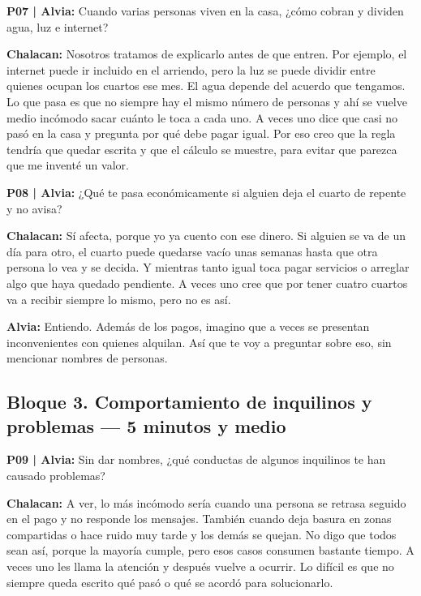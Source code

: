\documentclass[11pt,a4paper]{article}
\newcommand{\habla}[2]{
    \par\noindent\hspace*{0.8em}\textbf{#1:} #2\par
}
\newcommand{\pregunta}[2]{
    \par\noindent\textbf{P#1 | Alvia:} #2\par
}
\begin{document}
\pregunta{07}{
Cuando varias personas viven en la casa, ¿cómo cobran y dividen agua, luz e internet?
}

\habla{Chalacan}{
Nosotros tratamos de explicarlo antes de que entren. Por ejemplo, el internet puede ir incluido en el arriendo, pero la luz se puede dividir entre quienes ocupan los cuartos ese mes. El agua depende del acuerdo que tengamos. Lo que pasa es que no siempre hay el mismo número de personas y ahí se vuelve medio incómodo sacar cuánto le toca a cada uno. A veces uno dice que casi no pasó en la casa y pregunta por qué debe pagar igual. Por eso creo que la regla tendría que quedar escrita y que el cálculo se muestre, para evitar que parezca que me inventé un valor.
}


\pregunta{08}{
¿Qué te pasa económicamente si alguien deja el cuarto de repente y no avisa?
}

\habla{Chalacan}{
Sí afecta, porque yo ya cuento con ese dinero. Si alguien se va de un día para otro, el cuarto puede quedarse vacío unas semanas hasta que otra persona lo vea y se decida. Y mientras tanto igual toca pagar servicios o arreglar algo que haya quedado pendiente. A veces uno cree que por tener cuatro cuartos va a recibir siempre lo mismo, pero no es así.
}

\habla{Alvia}{
Entiendo. Además de los pagos, imagino que a veces se presentan inconvenientes con quienes alquilan. Así que te voy a preguntar sobre eso, sin mencionar nombres de personas.
}



\clearpage


\subsection*{Bloque 3. Comportamiento de inquilinos y problemas — 5 minutos y medio}

\pregunta{09}{
Sin dar nombres, ¿qué conductas de algunos inquilinos te han causado problemas?
}

\habla{Chalacan}{
A ver, lo más incómodo sería cuando una persona se retrasa seguido en el pago y no responde los mensajes. También cuando deja basura en zonas compartidas o hace ruido muy tarde y los demás se quejan. No digo que todos sean así, porque la mayoría cumple, pero esos casos consumen bastante tiempo. A veces uno les llama la atención y después vuelve a ocurrir. Lo difícil es que no siempre queda escrito qué pasó o qué se acordó para solucionarlo.
}
\end{document}
